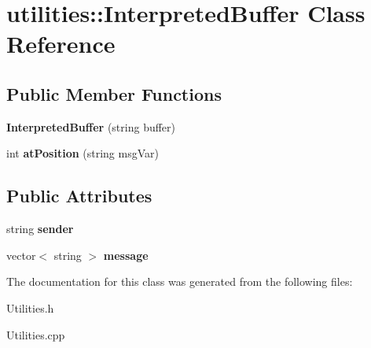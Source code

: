 \hypertarget{classutilities_1_1InterpretedBuffer}{\section{utilities\-:\-:\-Interpreted\-Buffer \-Class \-Reference}
\label{classutilities_1_1InterpretedBuffer}
}
\subsection*{\-Public \-Member \-Functions}
\begin{DoxyCompactItemize}
\item 
\hypertarget{classutilities_1_1InterpretedBuffer_adea092f85f0d41b852f717cbf2fecef0}{{\bfseries \-Interpreted\-Buffer} (string buffer)}\label{classutilities_1_1InterpretedBuffer_adea092f85f0d41b852f717cbf2fecef0}

\item 
\hypertarget{classutilities_1_1InterpretedBuffer_a575048c82d8206e94cd95acb0ada0483}{int {\bfseries at\-Position} (string msg\-Var)}\label{classutilities_1_1InterpretedBuffer_a575048c82d8206e94cd95acb0ada0483}

\end{DoxyCompactItemize}
\subsection*{\-Public \-Attributes}
\begin{DoxyCompactItemize}
\item 
\hypertarget{classutilities_1_1InterpretedBuffer_afa28b61107dccba01eafc169379773f1}{string {\bfseries sender}}\label{classutilities_1_1InterpretedBuffer_afa28b61107dccba01eafc169379773f1}

\item 
\hypertarget{classutilities_1_1InterpretedBuffer_a6ad2952aaad258f5fd66556ca64feaf6}{vector$<$ string $>$ {\bfseries message}}\label{classutilities_1_1InterpretedBuffer_a6ad2952aaad258f5fd66556ca64feaf6}

\end{DoxyCompactItemize}


\-The documentation for this class was generated from the following files\-:\begin{DoxyCompactItemize}
\item 
\-Utilities.\-h\item 
\-Utilities.\-cpp\end{DoxyCompactItemize}
